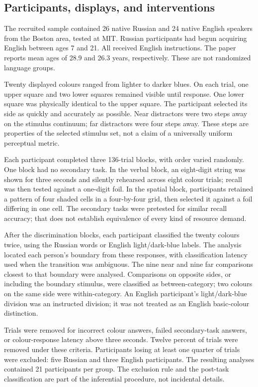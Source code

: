 \subsection{Participants, displays, and interventions}

The recruited sample contained 26 native Russian and 24 native English
speakers from the Boston area, tested at MIT. Russian participants had
begun acquiring English between ages 7 and 21. All received English
instructions. The paper reports mean ages of 28.9 and 26.3 years,
respectively. These are not randomized language groups.

Twenty displayed colours ranged from lighter to darker blues. On each
trial, one upper square and two lower squares remained visible until
response. One lower square was physically identical to the upper square.
The participant selected its side as quickly and accurately as possible.
Near distractors were two steps away on the stimulus continuum; far
distractors were four steps away. These steps are properties of the selected
stimulus set, not a claim of a universally uniform perceptual metric.

Each participant completed three 136-trial blocks, with order varied
randomly. One block had no secondary task. In the verbal block, an
eight-digit string was shown for three seconds and silently rehearsed
across eight colour trials; recall was then tested against a one-digit
foil. In the spatial block, participants retained a pattern of four shaded
cells in a four-by-four grid, then selected it against a foil differing in
one cell. The secondary tasks were pretested for similar recall accuracy;
that does not establish equivalence of every kind of resource demand.

After the discrimination blocks, each participant classified the twenty
colours twice, using the Russian words or English light/dark-blue labels.
The analysis located each person's boundary from these responses, with
classification latency used when the transition was ambiguous. The nine
near and nine far comparisons closest to that boundary were analysed.
Comparisons on opposite sides, or including the boundary stimulus, were
classified as between-category; two colours on the same side were within-category.
An English participant's light/dark-blue division was an instructed
division; it was not treated as an English basic-colour distinction.

Trials were removed for incorrect colour answers, failed secondary-task
answers, or colour-response latency above three seconds. Twelve percent
of trials were removed under these criteria. Participants losing at least
one quarter of trials were excluded: five Russian and three English
participants. The resulting analyses contained 21 participants per group.
The exclusion rule and the post-task classification are part of the
inferential procedure, not incidental details.

